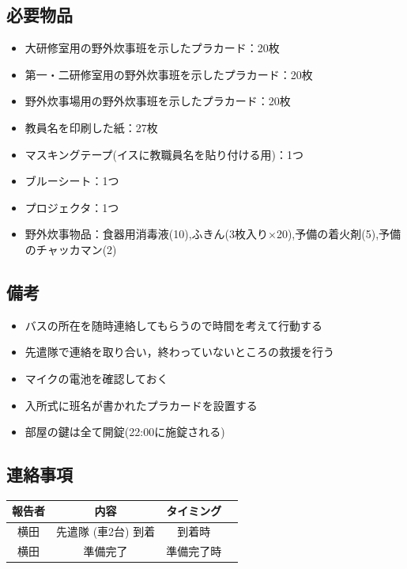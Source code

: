 \subsection{必要物品}
\begin{itemize}
\item 大研修室用の野外炊事班を示したプラカード：20枚
\item 第一・二研修室用の野外炊事班を示したプラカード：20枚
\item 野外炊事場用の野外炊事班を示したプラカード：20枚
\item 教員名を印刷した紙：27枚
\item マスキングテープ(イスに教職員名を貼り付ける用)：1つ
\item ブルーシート：1つ
\item プロジェクタ：1つ
\item 野外炊事物品：食器用消毒液(10),ふきん(3枚入り×20),予備の着火剤(5),予備のチャッカマン(2)
\end{itemize}


\subsection{備考}
\begin{itemize}
\item バスの所在を随時連絡してもらうので時間を考えて行動する
\item 先遣隊で連絡を取り合い，終わっていないところの救援を行う
\item マイクの電池を確認しておく
\item 入所式に班名が書かれたプラカードを設置する
\item 部屋の鍵は全て開錠(22:00に施錠される)
\end{itemize}


\subsection{連絡事項}
\begin{table}[h]
\begin{tabular}{|c|c|c|c|}
\hline
報告者 & 内容 & タイミング \\ \hline \hline
横田 & 先遣隊 (車2台) 到着 & 到着時\\ \hline
横田 & 準備完了 & 準備完了時 \\ \hline
\end{tabular}
\end{table}

%
